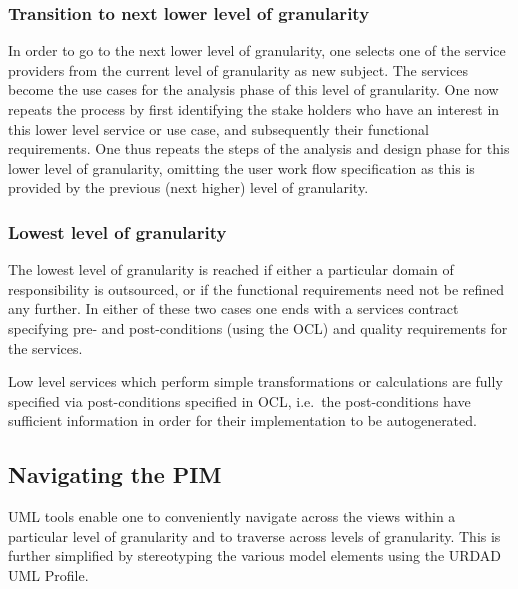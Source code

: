 \documentclass[reviewcopy]{elsart}
\begin{document}

\subsubsection{Transition to next lower level of granularity}

In order to go to the next lower level of granularity, one
selects one of the service providers from the current level of granularity
as new subject. The services become the use cases for the analysis phase
of this level of granularity. One now repeats the process by first identifying
the stake holders who have an interest in this lower level service or use case,
and subsequently their functional requirements.
One thus repeats the steps of the analysis and design phase for this lower
level of granularity, omitting the user work flow specification as this is
provided by the previous (next higher) level of granularity.


\subsubsection{Lowest level of granularity}

The lowest level of granularity is reached if either a particular domain
of responsibility is outsourced, or if the functional requirements need not be
refined any further. In either of these two cases one ends with a services
contract specifying pre- and post-conditions (using the OCL) and quality
requirements for the services.

Low level services which perform simple transformations or calculations are
fully specified via post-conditions specified in OCL, i.e.\ the post-conditions
have sufficient information in order for their implementation to be autogenerated.

\subsection{Navigating the PIM}

UML tools enable one to conveniently navigate across the views within a particular level of granularity and to traverse across levels of granularity. This is further simplified
by stereotyping the various model elements using the URDAD UML Profile.

\end{document}
